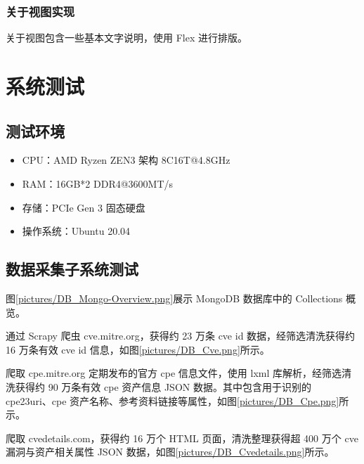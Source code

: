 \documentclass[a4paper,AutoFakeBold,oneside,12pt]{book}
\begin{document}
\subsection{关于视图实现}

关于视图包含一些基本文字说明，使用 Flex 进行排版。

\chapter{系统测试}

\section{测试环境}

\begin{itemize}
	\item CPU：AMD Ryzen ZEN3 架构 8C16T@4.8GHz
	\item RAM：16GB*2 DDR4@3600MT/s
	\item 存储：PCIe Gen 3 固态硬盘
	\item 操作系统：Ubuntu 20.04
\end{itemize}

\section{数据采集子系统测试}

图\ref{pictures/DB_Mongo-Overview.png}展示 MongoDB 数据库中的 Collections 概览。


通过 Scrapy 爬虫 cve.mitre.org，获得约 23 万条 cve id 数据，经筛选清洗获得约 16 万条有效 cve id 信息，如图\ref{pictures/DB_Cve.png}所示。


爬取 cpe.mitre.org 定期发布的官方 cpe 信息文件，使用 lxml 库解析，经筛选清洗获得约 90 万条有效 cpe 资产信息 JSON 数据。其中包含用于识别的 cpe23uri、cpe 资产名称、参考资料链接等属性，如图\ref{pictures/DB_Cpe.png}所示。


爬取 cvedetails.com，获得约 16 万个 HTML 页面，清洗整理获得超 400 万个 cve 漏洞与资产相关属性 JSON 数据，如图\ref{pictures/DB_Cvedetails.png}所示。
\end{document}
